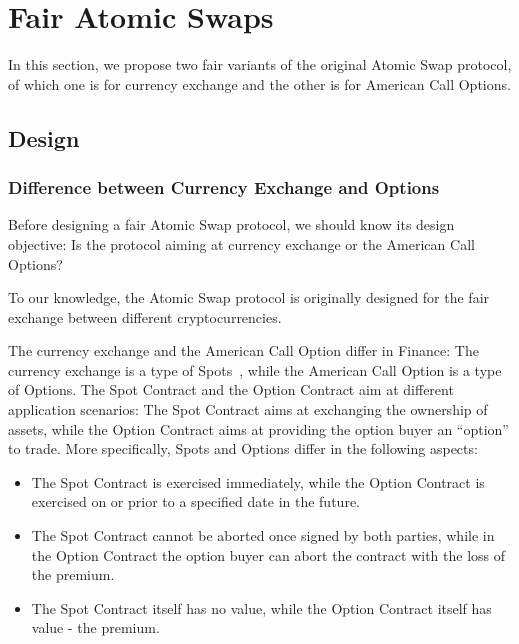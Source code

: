 \section{Fair Atomic Swaps}
\label{sec:fair_atomic_swap}

In this section, we propose two fair variants of the original Atomic Swap protocol, of which one is for currency exchange and the other is for American Call Options.



\subsection{Design}

\subsubsection{Difference between Currency Exchange and Options}
\label{subsubsec:diff_spot_option}

Before designing a fair Atomic Swap protocol, we should know its design objective:
Is the protocol aiming at currency exchange or the American Call Options?

To our knowledge, the Atomic Swap protocol is originally designed for the fair exchange between different cryptocurrencies.

The currency exchange and the American Call Option differ in Finance: The currency exchange is a type of Spots~\cite{hull1991introduction}, while the American Call Option is a type of Options.
The Spot Contract and the Option Contract aim at different application scenarios: The Spot Contract aims at exchanging the ownership of assets, while the Option Contract aims at providing the option buyer an ``option'' to trade.
More specifically, Spots and Options differ in the following aspects:

\begin{itemize}
    \item The Spot Contract is exercised immediately, while the Option Contract is exercised on or prior to a specified date in the future.
    \item The Spot Contract cannot be aborted once signed by both parties, while in the Option Contract the option buyer can abort the contract with the loss of the premium.
    \item The Spot Contract itself has no value, while the Option Contract itself has value - the premium.
\end{itemize}

